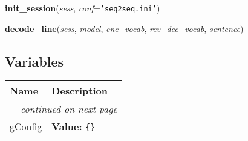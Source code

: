 \hspace{.8\funcindent}\begin{boxedminipage}{\funcwidth}

    \raggedright \textbf{init\_session}(\textit{sess}, \textit{conf}={\tt 'seq2seq.ini'})

\setlength{\parskip}{2ex}
\setlength{\parskip}{1ex}
    \end{boxedminipage}

    \label{Chatbot:execute:decode_line}

    \vspace{0.5ex}

\hspace{.8\funcindent}\begin{boxedminipage}{\funcwidth}

    \raggedright \textbf{decode\_line}(\textit{sess}, \textit{model}, \textit{enc\_vocab}, \textit{rev\_dec\_vocab}, \textit{sentence})

\setlength{\parskip}{2ex}
\setlength{\parskip}{1ex}
    \end{boxedminipage}



  \subsection{Variables}

    \vspace{-1cm}
\hspace{\varindent}\begin{longtable}{|p{\varnamewidth}|p{\vardescrwidth}|l}
\cline{1-2}
\cline{1-2} \centering \textbf{Name} & \centering \textbf{Description}& \\
\cline{1-2}
\endhead\cline{1-2}\multicolumn{3}{r}{\small\textit{continued on next page}}\\\endfoot\cline{1-2}
\endlastfoot\raggedright g\-C\-o\-n\-f\-i\-g\- & \raggedright \textbf{Value:} 
{\tt \{\}}&\\
\cline{1-2}
\end{longtable}

